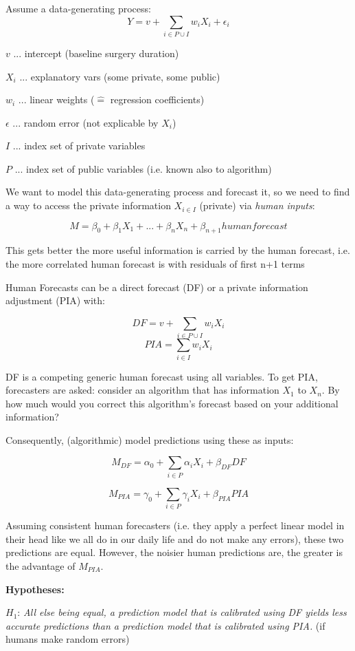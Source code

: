 \documentclass[12pt,a4paper]{article}
\begin{document}
Assume a data-generating process: \[ Y = v + \sum_{i \in P \cup I} w_i X_i + \epsilon_i \]

$v$ ... intercept (baseline surgery duration)

$X_i$ ... explanatory vars (some private, some public)

$w_i$ ... linear weights ($\hat{=}$ regression coefficients)

$\epsilon$ ... random error (not explicable by $X_i$)

$I$ ... index set of private variables

$P$ ...  index set of public variables (i.e. known also to algorithm)     


We want to model this data-generating process and forecast it, so we need to find a way to access the private information $X_{i \in I}$ (private) via \emph{human inputs}:
	
\[M = \beta_0 + \beta_1 X_1 + ... + \beta_n X_n + \beta_{n+1} humanforecast\]

This gets better the more useful information is carried by the human forecast, i.e. the more correlated human forecast is with residuals of first n+1 terms

Human Forecasts can be a direct forecast (DF) or a private information adjustment (PIA) with:

\[DF = v + \sum_{i \in P \cup I} w_i X_i\]
\[PIA = \sum_{i \in I} w_i X_i\]

DF is a competing generic human forecast using all variables. To get PIA, forecasters are asked: consider an algorithm that has information $X_1$ to $X_n$. By how much would you correct this algorithm's forecast based on your additional information?

Consequently, (algorithmic) model predictions using these as inputs:

\[M_{DF} = \alpha_0 + \sum_{i \in P} \alpha_i X_i + \beta_{DF} DF\]

\[M_{PIA} = \gamma_0 + \sum_{i \in P} \gamma_i X_i + \beta_{PIA} PIA\]

Assuming consistent human forecasters (i.e. they apply a perfect linear model in their head like we all do in our daily life and do not make any errors), these two predictions are equal. However, the noisier human predictions are, the greater is the advantage of $M_{PIA}$.    

\textbf{Hypotheses:} 

$H_1$: \emph{All else being equal, a prediction model that
is calibrated using DF yields less accurate predictions than a
prediction model that is calibrated using PIA.} (if humans make random errors)
\end{document}
